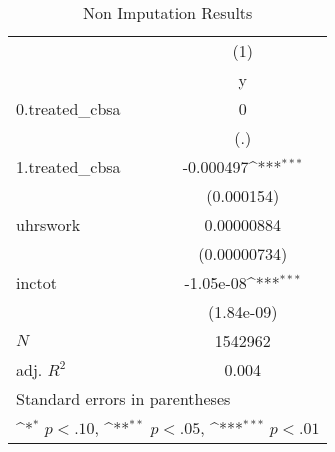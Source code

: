 \begin{table}[htbp]\centering
\def\sym#1{\ifmmode^{#1}\else\(^{#1}\)\fi}
\caption{Non Imputation Results}
\begin{tabular}{l*{1}{c}}
\hline\hline
            &\multicolumn{1}{c}{(1)}\\
            &\multicolumn{1}{c}{y}\\
\hline
0.treated\_cbsa&           0         \\
            &         (.)         \\
[1em]
1.treated\_cbsa&   -0.000497\sym{***}\\
            &  (0.000154)         \\
[1em]
uhrswork    &  0.00000884         \\
            &(0.00000734)         \\
[1em]
inctot      &   -1.05e-08\sym{***}\\
            &  (1.84e-09)         \\
\hline
\(N\)       &     1542962         \\
adj. \(R^{2}\)&       0.004         \\
\hline\hline
\multicolumn{2}{l}{\footnotesize Standard errors in parentheses}\\
\multicolumn{2}{l}{\footnotesize \sym{*} \(p<.10\), \sym{**} \(p<.05\), \sym{***} \(p<.01\)}\\
\end{tabular}
\end{table}
